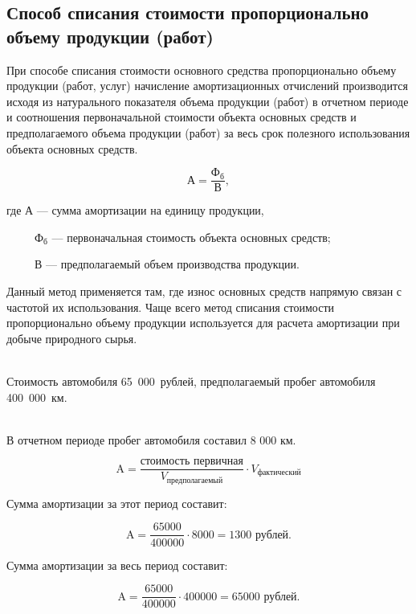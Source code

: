 \subsection{Способ списания стоимости пропорционально объему продукции (работ)}

\begin{tcolorbox}
При способе списания стоимости основного средства пропорционально объему
продукции (работ, услуг) начисление амортизационных отчислений производится
исходя из натурального показателя объема продукции (работ) в отчетном периоде и
соотношения первоначальной стоимости объекта основных средств и предполагаемого
объема продукции (работ) за весь срок полезного использования объекта основных
средств.

\begin{equation}
    \text{А} = \frac{\text{Ф}_{\text{б}}}{\text{В}},
\end{equation}

где $\text{А}$ --- сумма амортизации на единицу продукции,

~~~~~$\text{Ф}_{\text{б}}$ --- первоначальная стоимость объекта основных
                     средств;

~~~~~$\text{В}$ --- предполагаемый объем производства продукции.
\end{tcolorbox}

Данный метод применяется там, где износ основных средств напрямую связан с
частотой их использования. Чаще всего метод списания стоимости пропорционально
объему продукции используется для расчета амортизации при добыче природного
сырья.

\begin{example}
    \normalfont
    ~\\
    Стоимость автомобиля 65~000~рублей, предполагаемый пробег автомобиля
    400~000~км.
\end{example}

\begin{solution}
    \normalfont
    ~\\
В отчетном периоде пробег автомобиля составил 8 000 км.

$$\text{A} = \frac{\text{стоимость первичная}}{V_{\text{предполагаемый}}} \cdot
V_{\text{фактический}}$$

Сумма амортизации за этот период составит:

$$\text{A} = \frac{65 000}{400 000} \cdot 8 000 = 1 300 \text{ рублей.}$$

Сумма амортизации за весь период составит:

$$\text{A} = \frac{65 000}{400 000} \cdot 400 000 = 65 000 \text{ рублей.}$$
\end{solution}

